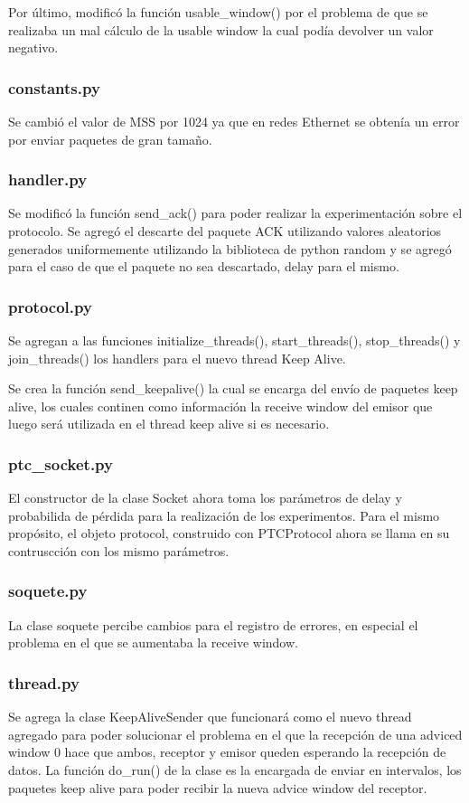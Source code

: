 \documentclass[a4paper, 10pt, twoside]{article}
\begin{document}
Por último, modificó la función usable\_window() por el problema de que se realizaba un mal cálculo de la usable window la cual podía devolver un valor negativo.

\subsubsection{constants.py}
Se cambió el valor de MSS por 1024 ya que en redes Ethernet se obtenía un error por enviar paquetes de gran tamaño.

\subsubsection{handler.py}
Se modificó la función send\_ack() para poder realizar la experimentación sobre el protocolo. Se agregó el descarte del paquete ACK utilizando valores aleatorios generados uniformemente utilizando la biblioteca de python random y se agregó para el caso de que el paquete no sea descartado, delay para el mismo.

\subsubsection{protocol.py}
Se agregan a las funciones initialize\_threads(), start\_threads(), stop\_threads() y join\_threads() los handlers para el nuevo thread Keep Alive.

Se crea la función send\_keepalive() la cual se encarga del envío de paquetes keep alive, los cuales continen como información la receive window del emisor que luego será utilizada en el thread keep alive si es necesario.

\subsubsection{ptc\_socket.py}
El constructor de la clase Socket ahora toma los parámetros de delay y probabilida de pérdida para la realización de los experimentos. Para el mismo propósito, el objeto protocol, construido con PTCProtocol ahora se llama en su contruscción con los mismo parámetros.


\subsubsection{soquete.py}
La clase soquete percibe cambios para el registro de errores, en especial el problema en el que se aumentaba la receive window.

\subsubsection{thread.py}
Se agrega la clase KeepAliveSender que funcionará como el nuevo thread agregado para poder solucionar el problema en el que la recepción de una adviced window 0 hace que ambos, receptor y emisor queden esperando la recepción de datos. La función do\_run() de la clase es la encargada de enviar en intervalos, los paquetes keep alive para poder recibir la nueva advice window del receptor.
\end{document}
